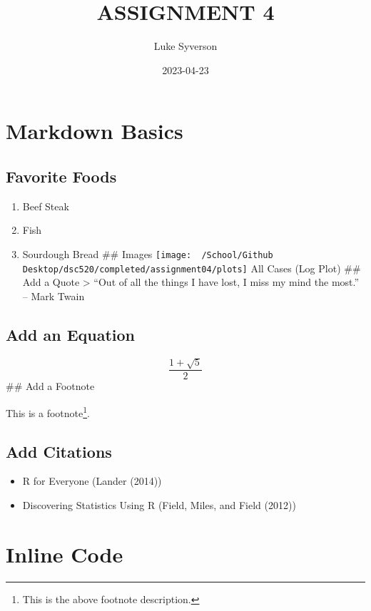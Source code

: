 \documentclass[
]{article}
\title{ASSIGNMENT 4}
\author{Luke Syverson}
\date{2023-04-23}
\providecommand{\tightlist}{%
  \setlength{\itemsep}{0pt}\setlength{\parskip}{0pt}}
\begin{document}
\maketitle

\hypertarget{markdown-basics}{%
\section{Markdown Basics}\label{markdown-basics}}

\hypertarget{favorite-foods}{%
\subsection{Favorite Foods}\label{favorite-foods}}

\begin{enumerate}
\def\labelenumi{\arabic{enumi})}
\tightlist
\item
  Beef Steak
\item
  Fish
\item
  Sourdough Bread \#\# Images
  \texttt{[image: ~/School/Github Desktop/dsc520/completed/assignment04/plots]}
  All Cases (Log Plot) \#\# Add a Quote \textgreater{} ``Out of all the
  things I have lost, I miss my mind the most.'' -- Mark Twain
\end{enumerate}

\hypertarget{add-an-equation}{%
\subsection{Add an Equation}\label{add-an-equation}}

\[\frac{1+ \sqrt5}{2}\] \#\# Add a Footnote

This is a footnote\footnote{This is the above footnote description.}.

\hypertarget{add-citations}{%
\subsection{Add Citations}\label{add-citations}}

\begin{itemize}
\tightlist
\item
  R for Everyone (Lander (2014))
\item
  Discovering Statistics Using R (Field, Miles, and Field (2012))
\end{itemize}

\hypertarget{inline-code}{%
\section{Inline Code}\label{inline-code}}
\end{document}
